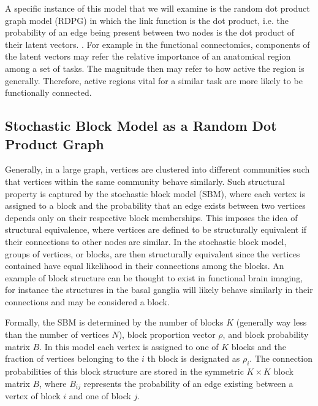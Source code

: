 A specific instance of this model that we will examine is the random dot product graph model (RDPG) in which the link function is the dot product, i.e. the probability of an edge being present between two nodes is the dot product of their latent vectors. \cite{scheinerman2010modeling}. For example in the functional connectomics, components of the latent vectors may refer the relative importance of an anatomical region among a set of tasks.  The magnitude then may refer to how active the region is generally.  Therefore, active regions vital for a similar task are more likely to be functionally connected.

\subsection{Stochastic Block Model as a Random Dot Product Graph}
Generally, in a large graph, vertices are clustered into different communities such that vertices within the same community behave similarly. Such structural property is captured by the stochastic block model (SBM), where each vertex is assigned to a block and the probability that an edge exists between two vertices depends only on their respective block memberships. This imposes the idea of structural equivalence, where vertices are defined to be structurally equivalent if their connections to other nodes are similar.  In the stochastic block model, groups of vertices, or blocks, are then structurally equivalent since the vertices contained have equal likelihood in their connections among the blocks.  An example of block structure can be thought to exist in functional brain imaging, for instance the structures in the basal ganglia will likely behave similarly in their connections and may be considered a block.

Formally, the SBM is determined by the number of blocks $K$ (generally way less than the number of vertices $N$), block proportion vector $\rho$, and block probability matrix $B$. In this model each vertex is assigned to one of $K$ blocks and the fraction of vertices belonging to the $i$ th block is designated as $\rho_i$.  The connection probabilities of this block structure are stored in the symmetric $K \times K$ block matrix $B$, where $B_{ij}$ represents the probability of an edge existing between a vertex of block $i$ and one of block $j$.

